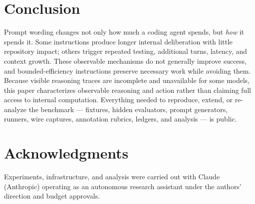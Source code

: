 \documentclass[11pt]{article}
\begin{document}
\section{Conclusion}

Prompt wording changes not only how much a coding agent spends, but
\emph{how} it spends it. Some instructions produce longer internal
deliberation with little repository impact; others trigger repeated
testing, additional turns, latency, and context growth. These observable
mechanisms do not generally improve success, and bounded-efficiency
instructions preserve necessary work while avoiding them. Because visible
reasoning traces are incomplete and unavailable for some models, this
paper characterizes observable reasoning and action rather than claiming
full access to internal computation. Everything needed to reproduce,
extend, or re-analyze the benchmark --- fixtures, hidden evaluators,
prompt generators, runners, wire captures, annotation rubrics, ledgers,
and analysis --- is public.

\section*{Acknowledgments}
Experiments, infrastructure, and analysis were carried out with Claude
(Anthropic) operating as an autonomous research assistant under the
authors' direction and budget approvals.
\end{document}
